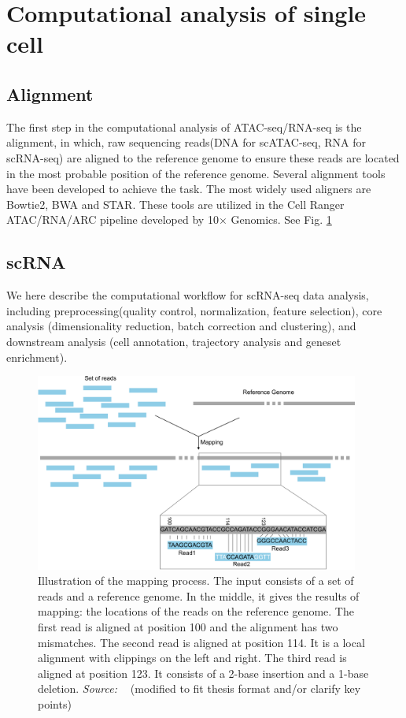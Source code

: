 \section{Computational analysis of single cell}
\label{background:computational_singlecell}
\subsection{Alignment}
\label{background:sec2:alignment}
The first step in the computational analysis of ATAC-seq/RNA-seq is the alignment,  in which, raw sequencing reads(DNA for scATAC-seq, RNA for scRNA-seq) are aligned to the reference genome to ensure these reads are located in the most probable position of the reference genome. Several alignment tools have been developed to achieve the task. The most widely used aligners are Bowtie2\citep{langmead2012bowtie2}, BWA\citep{li2009BWA} and STAR\citep{dobin2013star}.  These tools are utilized in the Cell Ranger ATAC/RNA/ARC pipeline developed by 10$\times$ Genomics. See Fig. \ref{fig:alignment}
\subsection{scRNA}
\label{background:sec2:scRNA}
We here describe the computational workflow for scRNA-seq data analysis, including preprocessing(quality control, normalization, feature selection), core analysis (dimensionality reduction, batch correction and clustering), and downstream analysis (cell annotation, trajectory analysis and geneset enrichment).
\begin{figure}[!ht]
	\centering
	\includegraphics[width=0.95\textwidth]{alignment/fig}
	\vspace{0.1cm}
	\caption[DNA fragments alignment schematic.]{ Illustration of the mapping process. The input consists of a set of reads and a reference genome. In the middle, it gives the results of mapping: the locations of the reads on the reference genome. The first read is aligned at position 100 and the alignment has two mismatches. The second read is aligned at position 114. It is a local alignment with clippings on the left and right. The third read is aligned at position 123. It consists of a 2-base insertion and a 1-base deletion. \emph{Source: ~\cite{galaxyprojectSequenceAnalysis2016alignment}} (modified to fit thesis format and/or clarify key points)}
	\label{fig:alignment}
\end{figure}


